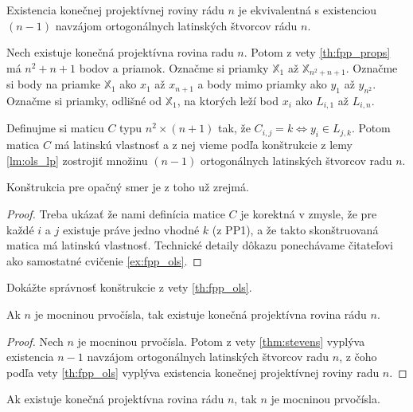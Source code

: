 \begin{theorem}
\label{th:fpp_ols}
Existencia konečnej projektívnej roviny rádu $n$ je ekvivalentná s existenciou $(n-1)$ navzájom ortogonálnych latinských štvorcov rádu $n$.
\end{theorem}
\begin{construction}
Nech existuje konečná projektívna rovina radu $n$.
Potom z vety \ref{th:fpp_props} má $n^2 + n + 1$ bodov a priamok.
Označme si priamky $\mathbb{X}_1$ až $\mathbb{X}_{n^2 + n + 1}$.
Označme si body na priamke $\mathbb{X}_1$ ako $x_1$ až $x_{n+1}$ a body mimo priamky ako $y_1$ až $y_{n^2}$.
Označme si priamky, odlišné od $\mathbb{X}_1$, na ktorých leží bod $x_{i}$ ako $L_{i, 1}$ až $L_{i, n}$.

Definujme si maticu $C$ typu $n^2 \times (n+1)$ tak, že $C_{i, j} = k \Longleftrightarrow y_i \in L_{j, k}$.
Potom matica $C$ má latinskú vlastnosť a z nej vieme podľa konštrukcie z lemy \ref{lm:ols_lp} zostrojiť množinu $(n-1)$ ortogonálnych latinských štvorcov radu $n$.

Konštrukcia pre opačný smer je z toho už zrejmá.
\end{construction}
\begin{proof}
Treba ukázať že nami definícia matice $C$ je korektná v zmysle, že pre každé $i$ a $j$ existuje práve jedno vhodné $k$ (z PP1), a že takto skonštruovaná matica má latinskú vlastnosť.
Technické detaily dôkazu ponechávame čitateľovi ako samostatné cvičenie \ref{ex:fpp_ols}.
\end{proof}

\begin{exercise}
\label{ex:fpp_ols}
Dokážte správnosť konštrukcie z vety \ref{th:fpp_ols}.
\end{exercise}

\begin{corollary}
Ak $n$ je mocninou prvočísla, tak existuje konečná projektívna rovina rádu $n$.
\end{corollary}
\begin{proof}
Nech $n$ je mocninou prvočísla. Potom z vety \ref{thm:stevens} vyplýva existencia $n-1$ navzájom ortogonálnych latinských štvorcov radu $n$, z čoho podľa vety \ref{th:fpp_ols} vyplýva existencia konečnej projektívnej roviny radu $n$.
\end{proof}

\begin{hypothesis}
Ak existuje konečná projektívna rovina rádu $n$, tak $n$ je mocninou prvočísla.
\end{hypothesis}

